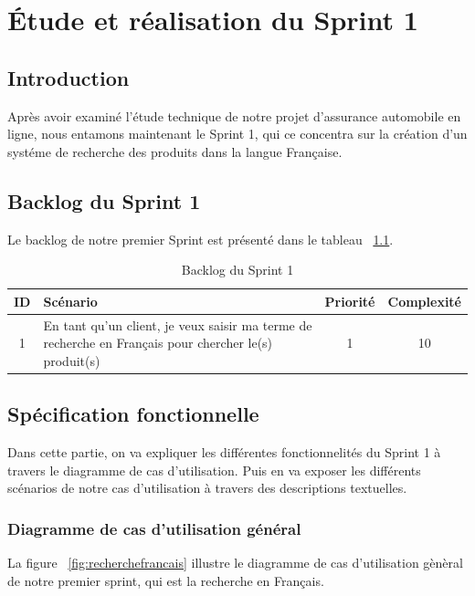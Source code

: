 \chapter{Étude et réalisation du Sprint 1}
\section{Introduction}
\noindent
Après avoir examiné l'étude technique de notre projet d'assurance automobile en ligne, nous entamons maintenant le Sprint 1, qui ce concentra sur la création d'un systéme de recherche des produits dans la langue Française.

\section{Backlog du Sprint 1}
\noindent
Le backlog de notre premier Sprint est présenté dans le tableau ~\ref{tab:sprint1}.

\begin{table}[H]
	\centering

	\begin{tabularx}{\textwidth}{|c|X|c|c|}
		\hline
		\rowcolor{blue!20}
		\textbf{ID} & \textbf{Scénario}                                                                                     & \textbf{Priorité} & \textbf{Complexité} \\ \hline
		1           & En tant qu'un client, je veux saisir ma terme de recherche en Français pour chercher le(s) produit(s) & 1                 & 10                  \\ \hline
	\end{tabularx}
	\caption{Backlog du Sprint 1}
	\label{tab:sprint1}
\end{table}

\section{Spécification fonctionnelle}
\noindent
Dans cette partie, on va expliquer les différentes fonctionnelités du Sprint 1 à travers le diagramme de cas d'utilisation. Puis en va exposer les différents scénarios de notre cas d'utilisation à travers des descriptions textuelles.

\subsection{Diagramme de cas d'utilisation général}
\noindent
La figure ~\ref{fig:recherchefrancais} illustre le diagramme de cas d'utilisation gènèral de notre premier sprint, qui est la recherche en Français.

